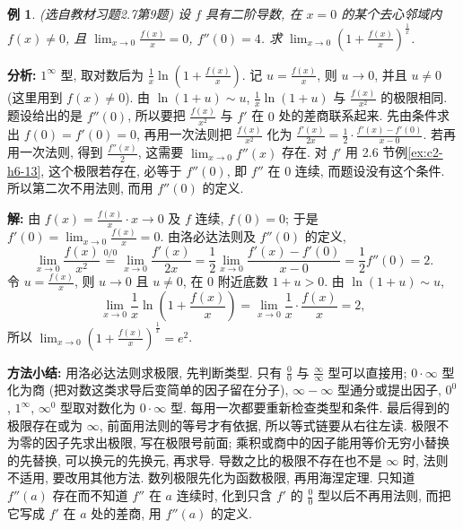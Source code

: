 \documentclass[UTF8,openany]{ctexbook}
\theoremstyle{chinesetextbook}
\newtheorem{example}{例}[section]
\newenvironment{cnsolution}{\par\indent\textbf{解:} \ignorespaces}{\par}
\begin{document}
\begin{example}\label{ex:c2-h7-9}
\textnormal{(选自教材习题2.7第9题)} 设 $f$ 具有二阶导数, 在 $x=0$ 的某个去心邻域内 $f(x)\ne0$, 且 $\displaystyle\lim_{x\to0}\frac{f(x)}x=0$, $f''(0)=4$. 求 $\displaystyle\lim_{x\to0}\left(1+\frac{f(x)}x\right)^{\frac1x}$.
\end{example}
\par\indent\textbf{分析:} $1^\infty$ 型, 取对数后为 $\displaystyle\frac1x\ln\left(1+\frac{f(x)}x\right)$. 记 $\displaystyle u=\frac{f(x)}x$, 则 $u\to0$, 并且 $u\ne0$ (这里用到 $f(x)\ne0$). 由 $\ln(1+u)\sim u$, $\displaystyle\frac1x\ln(1+u)$ 与 $\displaystyle\frac{f(x)}{x^2}$ 的极限相同. 题设给出的是 $f''(0)$, 所以要把 $\displaystyle\frac{f(x)}{x^2}$ 与 $f'$ 在 $0$ 处的差商联系起来. 先由条件求出 $f(0)=f'(0)=0$, 再用一次法则把 $\displaystyle\frac{f(x)}{x^2}$ 化为 $\displaystyle\frac{f'(x)}{2x}=\frac12\cdot\frac{f'(x)-f'(0)}{x-0}$. 若再用一次法则, 得到 $\displaystyle\frac{f''(x)}2$, 这需要 $\displaystyle\lim_{x\to0}f''(x)$ 存在. 对 $f'$ 用 2.6 节例\ref{ex:c2-h6-13}, 这个极限若存在, 必等于 $f''(0)$, 即 $f''$ 在 $0$ 连续, 而题设没有这个条件. 所以第二次不用法则, 而用 $f''(0)$ 的定义.
\begin{cnsolution}
由 $\displaystyle f(x)=\frac{f(x)}x\cdot x\to0$ 及 $f$ 连续, $f(0)=0$; 于是 $\displaystyle f'(0)=\lim_{x\to0}\frac{f(x)}x=0$. 由洛必达法则及 $f''(0)$ 的定义,
\[
\lim_{x\to0}\frac{f(x)}{x^2}\overset{0/0}{=}\lim_{x\to0}\frac{f'(x)}{2x}=\frac12\lim_{x\to0}\frac{f'(x)-f'(0)}{x-0}=\frac12f''(0)=2.
\]
令 $\displaystyle u=\frac{f(x)}x$, 则 $u\to0$ 且 $u\ne0$, 在 $0$ 附近底数 $1+u>0$. 由 $\ln(1+u)\sim u$,
\[
\lim_{x\to0}\frac1x\ln\left(1+\frac{f(x)}x\right)=\lim_{x\to0}\frac1x\cdot\frac{f(x)}x=2,
\]
所以 $\displaystyle\lim_{x\to0}\left(1+\frac{f(x)}x\right)^{\frac1x}=e^2$.
\end{cnsolution}
\par\indent\textbf{方法小结:} 用洛必达法则求极限, 先判断类型. 只有 $\displaystyle\frac00$ 与 $\displaystyle\frac\infty\infty$ 型可以直接用; $0\cdot\infty$ 型化为商 (把对数这类求导后变简单的因子留在分子), $\infty-\infty$ 型通分或提出因子, $0^0$, $1^\infty$, $\infty^0$ 型取对数化为 $0\cdot\infty$ 型. 每用一次都要重新检查类型和条件. 最后得到的极限存在或为 $\infty$, 前面用法则的等号才有依据, 所以等式链要从右往左读. 极限不为零的因子先求出极限, 写在极限号前面; 乘积或商中的因子能用等价无穷小替换的先替换, 可以换元的先换元, 再求导. 导数之比的极限不存在也不是 $\infty$ 时, 法则不适用, 要改用其他方法. 数列极限先化为函数极限, 再用海涅定理. 只知道 $f''(a)$ 存在而不知道 $f''$ 在 $a$ 连续时, 化到只含 $f'$ 的 $\displaystyle\frac00$ 型以后不再用法则, 而把它写成 $f'$ 在 $a$ 处的差商, 用 $f''(a)$ 的定义.
\end{document}
